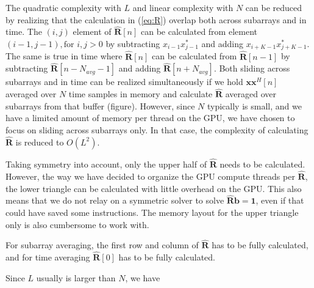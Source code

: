 \documentclass[journal]{IEEEtran}
\newcommand{\mat}[1]{\mathbf{#1}}
\renewcommand{\vec}[1]{\mathbf{#1}}
\begin{document}
The quadratic complexity with $L$ and linear complexity with $N$ can be reduced by realizing that the calculation in (\ref{eq:R}) overlap both across subarrays and in time. The $(i,j)$ element of $\mat{\hat{R}}[n]$ can be calculated from element $(i-1, j-1), \text{for } i,j > 0$ by subtracting $x_{i-1}x_{j-1}^*$ and adding $x_{i+K-1}x_{j+K-1}^*$. The same is true in time where $\mat{\hat{R}}[n]$ can be calculated from $\mat{\hat{R}}[n-1]$ by subtracting $\mat{\hat{R}}[n-N_{avg}-1]$ and adding $\mat{\hat{R}}[n+N_{avg}]$. Both sliding across subarrays and in time can be realized simultaneously if we hold $\vec{x}\vec{x}^H[n]$ averaged over $N$ time samples in memory and calculate $\mat{\hat{R}}$ averaged over subarrays from that buffer (figure). However, since $N$ typically is small, and we have a limited amount of memory per thread on the GPU, we have chosen to focus on sliding across subarrays only. In that case, the complexity of calculating $\mat{\hat{R}}$ is reduced to $O(L^2)$.

Taking symmetry into account, only the upper half of $\mat{\hat{R}}$ needs to be calculated. However, the way we have decided to organize the GPU compute threads per $\mat{\hat{R}}$, the lower triangle can be calculated with little overhead on the GPU. This also means that we do not relay on a symmetric solver to solve $\mat{\hat{R}}\vec{b} = \vec{1}$, even if that could have saved some instructions. The memory layout for the upper triangle only is also cumbersome to work with. 

For subarray averaging, the first row and column of $\mat{\hat{R}}$ has to be fully calculated, and for time averaging $\mat{\hat{R}}[0]$ has to be fully calculated.

Since $L$ usually is larger than $N$, we have 

\end{document}
